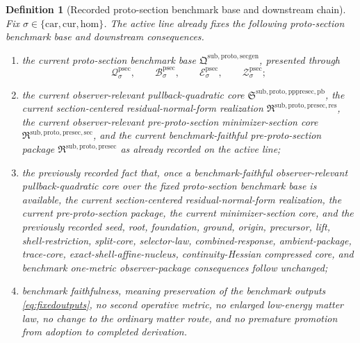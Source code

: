 \documentclass[11pt]{article}
\newcommand{\Car}{\mathrm{car}}
\newcommand{\Cur}{\mathrm{cur}}
\newcommand{\Hom}{\mathrm{hom}}
\newcommand{\ProtoSectionPackage}{\mathfrak Q^{\mathrm{sub,proto,secgen}}}
\newcommand{\ProtoSectionState}[1]{\mathcal Q_{#1}^{\mathrm{psec}}}
\newcommand{\ProtoSectionBody}[1]{\mathcal B_{#1}^{\mathrm{psec}}}
\newcommand{\ProtoSectionFunctional}[1]{\mathscr E_{#1}^{\mathrm{psec}}}
\newcommand{\ProtoSectionShell}[1]{\mathcal Z_{#1}^{\mathrm{psec}}}
\newcommand{\PreProtoSectionPackage}{\mathfrak R^{\mathrm{sub,proto,presec}}}
\newcommand{\PreProtoSectionMinSectionCore}{\mathfrak R^{\mathrm{sub,proto,presec,sec}}}
\newcommand{\PreProtoSectionResidualPackage}{\mathfrak R^{\mathrm{sub,proto,presec,res}}}
\newcommand{\PrePreProtoSectionPullbackCore}{\mathfrak S^{\mathrm{sub,proto,pppresec,pb}}}
\newtheorem{definition}{Definition}
\begin{document}
\begin{definition}[Recorded proto-section benchmark base and downstream chain]
\label{def:downstream}
Fix \(\sigma\in\{\Car,\Cur,\Hom\}\). The active line already fixes the following proto-section benchmark base and downstream consequences.
\begin{enumerate}
    \item the current proto-section benchmark base \(\ProtoSectionPackage\), presented through
    \[
    \ProtoSectionState{\sigma},\qquad
    \ProtoSectionBody{\sigma},\qquad
    \ProtoSectionFunctional{\sigma},\qquad
    \ProtoSectionShell{\sigma};
    \]
    \item the current observer-relevant pullback-quadratic core \(\PrePreProtoSectionPullbackCore\), the current section-centered residual-normal-form realization \(\PreProtoSectionResidualPackage\), the current observer-relevant pre-proto-section minimizer-section core \(\PreProtoSectionMinSectionCore\), and the current benchmark-faithful pre-proto-section package \(\PreProtoSectionPackage\) as already recorded on the active line;
    \item the previously recorded fact that, once a benchmark-faithful observer-relevant pullback-quadratic core over the fixed proto-section benchmark base is available, the current section-centered residual-normal-form realization, the current pre-proto-section package, the current minimizer-section core, and the previously recorded seed, root, foundation, ground, origin, precursor, lift, shell-restriction, split-core, selector-law, combined-response, ambient-package, trace-core, exact-shell-affine-nucleus, continuity-Hessian compressed core, and benchmark one-metric observer-package consequences follow unchanged;
    \item benchmark faithfulness, meaning preservation of the benchmark outputs \eqref{eq:fixedoutputs}, no second operative metric, no enlarged low-energy matter law, no change to the ordinary matter route, and no premature promotion from adoption to completed derivation.
\end{enumerate}
\end{definition}
\end{document}
